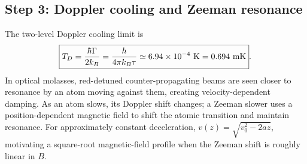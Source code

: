 \subsection*{Step 3: Doppler cooling and Zeeman resonance}
The two-level Doppler cooling limit is
\[
\boxed{T_D=\frac{\hbar\Gamma}{2k_B}
=\frac{h}{4\pi k_B\tau}
\simeq6.94\times10^{-4}\ {\rm K}=0.694\ {\rm mK}}.
\]
In optical molasses, red-detuned counter-propagating
beams are seen closer to resonance by an atom moving
against them, creating velocity-dependent damping.
As an atom slows, its Doppler shift changes; a
Zeeman slower uses a position-dependent magnetic field
to shift the atomic transition and maintain resonance.
For approximately constant deceleration,
\(v(z)=\sqrt{v_0^2-2az}\), motivating a
square-root magnetic-field profile when the Zeeman
shift is roughly linear in \(B\).

